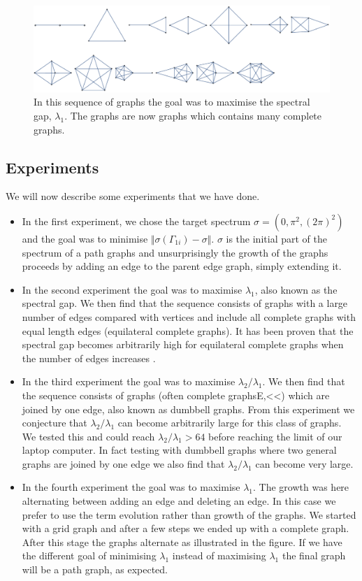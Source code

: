 \documentclass[a4paper]{article}
\begin{document}
\begin{figure}
\centering
\includegraphics[width=1.0\textwidth]{MaxSpectralGap.pdf}
\caption{\label{MaxSpectralGap:all}In this sequence of graphs the goal was to maximise the spectral gap, $\lambda_{1}$. The graphs are now graphs which contains many complete graphs.}
\end{figure}


\subsection{Experiments}
We will now describe some experiments that we have done. 
\begin{itemize}
  \item In the first experiment, we chose the target spectrum $\sigma=(0, \pi^2, (2\pi)^2)$ and the goal was to minimise $\Vert \sigma(\Gamma_{1i})-\sigma \Vert$. $\sigma$ is the initial part of the spectrum of a path graphs and unsurprisingly the growth of the graphs proceeds by adding an edge to the parent edge graph, simply extending it.
  \item In the second experiment the goal was to maximise $\lambda_{1}$, also known as the spectral gap. We then find that the sequence consists of graphs with a large number of edges compared with vertices and include all complete graphs with equal length edges (equilateral complete graphs). It has been proven that the spectral gap becomes arbitrarily high for equilateral complete graphs when the number of edges increases \cite{kennedy2015spectral}.
  \item In the third experiment the goal was to maximise $\lambda_{2}/\lambda_{1}$. We then find that the sequence consists of graphs (often complete graphsE,<<) which are joined by one edge, also known as dumbbell graphs. From this experiment we conjecture that $\lambda_{2}/\lambda_{1}$ can become arbitrarily large for this class of graphs. We tested this and could reach $\lambda_{2}/\lambda_{1}>64$ before reaching the limit of our laptop computer. In fact testing with dumbbell graphs where two general graphs are joined by one edge we also find that $\lambda_{2}/\lambda_{1}$ can become very large.
  \item In the fourth experiment the goal was to maximise $\lambda_{1}$. The growth was here alternating between adding an edge and deleting an edge. In this case we prefer to use the term evolution rather than growth of the graphs. We started with a grid graph and after a few steps we ended up with a complete graph. After this stage the graphs alternate as illustrated in the figure. If we have the different goal of minimising $\lambda_{1}$ instead of maximising $\lambda_{1}$ the final graph will be a path graph, as expected.
\end{itemize} 
\end{document}
